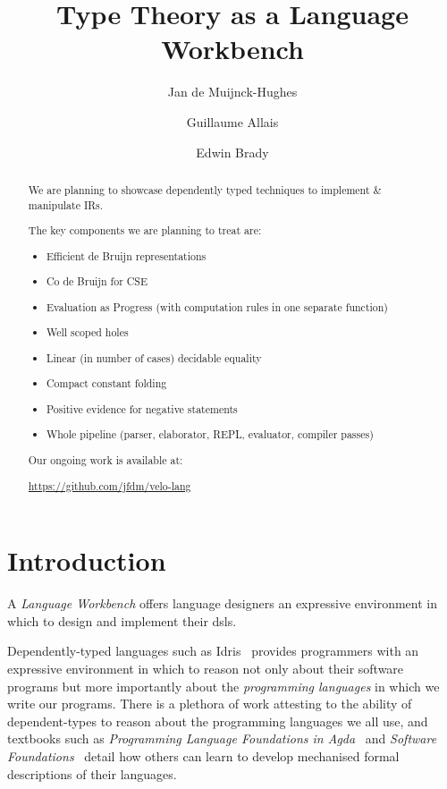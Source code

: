 \documentclass[%
draft,
a4paper,
UKenglish,
cleveref,
autoref,
thm-restate,
pdfa
]{oasics-v2021}
\title{Type Theory as a Language Workbench} %
\author
{Jan {de Muijnck-Hughes}}
{University of Glasgow, UK}
{Jan.deMuijnck-Hughes@glasgow.ac.uk}
{https://orcid.org/0000-0003-2185-8543}
{} %
\author
{Guillaume Allais}
{University of St Andrews, UK}
{gxa1@st-andrews.ac.uk} %
{https://orcid.org/0000-0002-4091-657X} %
{} %
\author
{Edwin Brady}
{University of St Andrews, UK}
{ecb10@st-andrews.ac.uk} %
{} %
{} %
\begin{document}
\maketitle


\begin{abstract}
We are planning to showcase dependently typed techniques to implement \& manipulate IRs.

The key components we are planning to treat are:

\begin{itemize}
\item Efficient de Bruijn representations
\item Co de Bruijn for CSE
\item Evaluation as Progress (with computation rules in one separate function)
\item Well scoped holes
\item Linear (in number of cases) decidable equality
\item Compact constant folding
\item Positive evidence for negative statements
\item Whole pipeline (parser, elaborator, REPL, evaluator, compiler passes)
\end{itemize}

Our ongoing work is available at:

\url{https://github.com/jfdm/velo-lang}
\end{abstract}

\section{Introduction}
\label{sec:introduction}

A \emph{Language Workbench} offers language designers an expressive environment in which to design and implement their \Acp{dsl}.

Dependently-typed languages such as Idris~\cite{DBLP:conf/ecoop/Brady21} provides programmers with an expressive environment in which to reason not only about their software programs but more importantly about the \emph{programming languages} in which we write our programs.
There is a plethora of work attesting to the ability of dependent-types to reason about the programming languages we all use, and textbooks such as \emph{Programming Language Foundations in Agda}~\cite{plfa22.08} and \emph{Software Foundations}~\cite{Pierce:SF2} detail how others can learn to develop mechanised formal descriptions of their languages.
\end{document}
